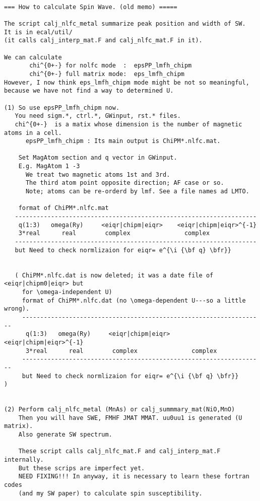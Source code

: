 \documentclass[a4paper,10pt,epsf,fleqn]{article}
\newcommand{\bfr}{{\bf r}}
\begin{document}
\begin{verbatim}

=== How to calculate Spin Wave. (old memo) =====

The script calj_nlfc_metal summarize peak position and width of SW.
It is in ecal/util/
(it calls calj_interp_mat.F and calj_nlfc_mat.F in it).

We can calculate 
       chi^{0+-} for nolfc mode  :  epsPP_lmfh_chipm
       chi^{0+-} full matrix mode:  eps_lmfh_chipm
However, I now think eps_lmfh_chipm mode might be not so meaningful, 
because we have not find a way to determined U.

(1) So use epsPP_lmfh_chipm now. 
   You need sigm.*, ctrl.*, GWinput, rst.* files.
   chi^{0+-}  is a matix whose dimension is the number of magnetic atoms in a cell.
      epsPP_lmfh_chipm : Its main output is ChiPM*.nlfc.mat.

    Set MagAtom section and q vector in GWinput.
    E.g. MagAtom 1 -3 
      We treat two magnetic atoms 1st and 3rd.
      The third atom point opposite direction; AF case or so.
      Note; atoms can be re-orderd by lmf. See a file names ad LMTO.

    format of ChiPM*.nlfc.mat
   -------------------------------------------------------------------
    q(1:3)   omega(Ry)     <eiqr|chipm|eiqr>    <eiqr|chipm|eiqr>^{-1}
    3*real      real        complex               complex
   -------------------------------------------------------------------
   but Need to check normlizaion for eiqr= e^{\i {\bf q} \bfr}}


   ( ChiPM*.nlfc.dat is now deleted; it was a date file of <eiqr|chipm0|eiqr> but 
     for \omega-independent U)
     format of ChiPM*.nlfc.dat (no \omega-dependent U---so a little wrong).
     -------------------------------------------------------------------
      q(1:3)   omega(Ry)     <eiqr|chipm|eiqr>    <eiqr|chipm|eiqr>^{-1}
      3*real      real        complex               complex
     -------------------------------------------------------------------
     but Need to check normlizaion for eiqr= e^{\i {\bf q} \bfr}}         )


(2) Perform calj_nlfc_metal (MnAs) or calj_summmary_mat(NiO,MnO)
    Then you will have SWE, FMHF JMAT MMAT. uu0uu1 is generated (U matrix). 
    Also generate SW spectrum.

    These script calls calj_nlfc_mat.F and calj_interp_mat.F internally.
    But these scrips are imperfect yet. 
    NEED FIXING!!! In anyway, it is necessary to learn these fortran codes 
    (and my SW paper) to calculate spin susceptibility.


\end{verbatim}
\end{document}
